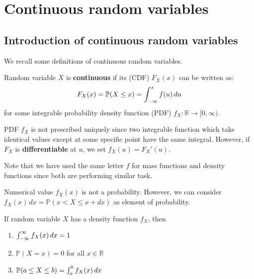 \documentclass{huhtakm-template-book}
\newcommand{\prob}{\mathbb{P}}
\begin{document}
\chapter{Continuous random variables}
\section{Introduction of continuous random variables}
    We recall some definitions of continuous random variables.
    \begin{defn}
        Random variable $X$ is \textbf{continuous} if its  (CDF) $F_{X}(x)$ can be written as:
        \begin{equation*}
            F_{X}(x)=\prob(X\leq x)=\intlu{-\infty}{x}f(u)\,du
        \end{equation*}
        for some integrable probability density function (PDF) $f_{X}:\mathbb{R}\to[0,\infty)$.
    \end{defn}
    \begin{rem}
        PDF $f_{X}$ is not prescribed uniquely since two integrable function which take identical values except at some specific point have the same integral. However, if $F_{X}$ is \textbf{differentiable} at $u$, we set $f_{X}(u)=F_{X}'(u)$.
    \end{rem}
    Note that we have used the same letter $f$ for mass functions and density functions since both are performing similar task.
    \begin{rem}
        Numerical value $f_{X}(x)$ is not a probability. However, we can consider $f_{X}(x)\,dx=\prob(x<X\leq x+dx)$ as element of probability.
    \end{rem}
    \begin{lem}
        \label{properties of density function}
        If random variable $X$ has a density function $f_{X}$, then
        \begin{enumerate}
            \item $\int_{-\infty}^{\infty} f_{X}(x)\,dx=1$
            \item $\prob(X=x)=0$ for all $x\in\mathbb{R}$
            \item $\prob(a\leq X\leq b)=\intlu{a}{b}f_{X}(x)\,dx$
        \end{enumerate}
    \end{lem}
\end{document}
